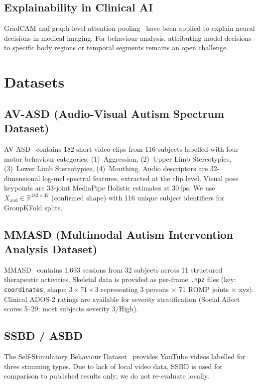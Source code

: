 \documentclass[conference]{IEEEtran}
\begin{document}
\subsection{Explainability in Clinical AI}
GradCAM \cite{Selvaraju2017} and graph-level attention pooling~\cite{Lee2019} have been 
applied to explain neural decisions in medical imaging. For behaviour analysis, 
attributing model decisions to specific body regions or temporal segments remains 
an open challenge.

\section{Datasets}
\label{sec:datasets}

\subsection{AV-ASD (Audio-Visual Autism Spectrum Dataset)}
AV-ASD~\cite{Wan2023} contains 182 short video clips from 116 subjects labelled 
with four motor behaviour categories:
(1)~Aggression, (2)~Upper Limb Stereotypies, (3)~Lower Limb Stereotypies, (4)~Mouthing.
Audio descriptors are 32-dimensional log-mel spectral features, 
extracted at the clip level. Visual pose keypoints are 33-joint MediaPipe Holistic 
estimates at 30\,fps. We use $X_{\text{aud}} \in \mathbb{R}^{182 \times 32}$ 
(confirmed shape) with 116 unique subject identifiers for GroupKFold splits.

\subsection{MMASD (Multimodal Autism Intervention Analysis Dataset)}
MMASD~\cite{Krishnaswamy2022} contains 1,693 sessions from 32 subjects across 
11 structured therapeutic activities. Skeletal data is provided as per-frame 
\texttt{.npz} files (key: \texttt{coordinates}, shape: $3 \times 71 \times 3$ 
representing 3 persons $\times$ 71 ROMP joints $\times$ xyz).
Clinical ADOS-2 ratings are available for severity stratification 
(Social Affect scores 5–29; most subjects severity 3/High).

\subsection{SSBD / ASBD}
The Self-Stimulatory Behaviour Dataset~\cite{Rajagopalan2013} provides YouTube videos 
labelled for three stimming types. Due to lack of local video data, SSBD is used for 
comparison to published results only; we do not re-evaluate locally.
\end{document}
